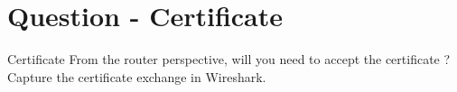 \section{Question - Certificate}

\begin{questionBox}{Certificate}
    From the router perspective, will you need to accept the certificate ? Capture the certificate exchange in Wireshark.
\end{questionBox}
